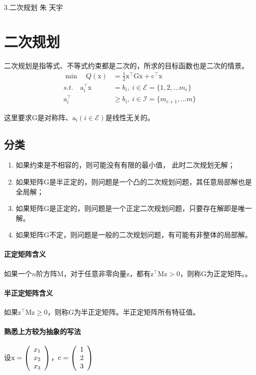 \documentclass[a4paper]{D:/repositories/MyDGP/latex/PaperReadingLog}
\begin{document}
\PaperInfo
{3.二次规划}
{朱}
{天宇}
{}

\section{二次规划}
二次规划是指等式、不等式约束都是二次的，所求的目标函数也是二次的情景。
$$
\begin{aligned}
    \min\quad Q(\mathrm{x})&=\frac{1}{2}\mathrm{x}^\top\mathrm{G}\mathrm{x}+\mathrm{c}^\top\mathrm{x}\\
    s.t.\quad \mathrm{a}_i^\top\mathrm{x}&=b_i,\ i\in\mathcal{E}=\{1,2,...m_e\}\\
    \mathrm{a}_i^\top&\ge b_i,\ i\in\mathcal{I}=\{m_{e+1},...m\}
\end{aligned}
$$

这里要求$\mathrm{G}$是对称阵、$\mathrm{a}_i(i\in\mathcal{E})$是线性无关的。

\subsection{分类}
\begin{enumerate}
    \item 如果约束是不相容的，则可能没有有限的最小值， 此时二次规划无解；
    \item 如果矩阵$\mathrm{G}$是半正定的，则问题是一个凸的二次规划问题，其任意局部解也是全局解；
    \item 如果矩阵$\mathrm{G}$是正定的，则问题是一个正定二次规划问题，只要存在解即是唯一解。
    \item 如果矩阵$\mathrm{G}$不定，则问题是一般的二次规划问题，有可能有非整体的局部解。
\end{enumerate}

\paragraph{正定矩阵含义}如果一个$n$阶方阵$\mathrm{M}$，对于任意非零向量$\mathrm{z}$，都有$\mathrm{z}^\top\mathrm{M}\mathrm{z}>0$，则称$\mathrm{G}$为正定矩阵。。

\paragraph{半正定矩阵含义}如果$\mathrm{z}^\top\mathrm{M}\mathrm{z}\ge0$，则称$\mathrm{G}$为半正定矩阵。半正定矩阵所有特征值。

\paragraph{熟悉上方较为抽象的写法}设$
\mathrm{x}=\left(\begin{array}[]{c}
    x_1\\x_2\\x_3
\end{array}
\right)
$，$
\mathrm{c}=\left(\begin{array}[]{c}
    1\\2\\3
\end{array}
\right)
$
\end{document}
